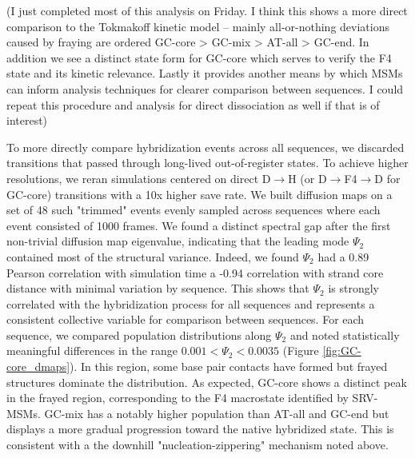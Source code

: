 \documentclass[journal=jpcbfk,manuscript=article]{achemso}
\begin{document}
(I just completed most of this analysis on Friday. I think this shows a more direct comparison to the Tokmakoff kinetic model -- mainly all-or-nothing deviations caused by fraying are ordered GC-core > GC-mix > AT-all > GC-end. In addition we see a distinct state form for GC-core which serves to verify the F4 state and its kinetic relevance. Lastly it provides another means by which MSMs can inform analysis techniques for clearer comparison between sequences. I could repeat this procedure and analysis for direct dissociation as well if that is of interest)

To more directly compare hybridization events across all sequences, we discarded transitions that passed through long-lived out-of-register states. To achieve higher resolutions, we reran simulations centered on direct D$\rightarrow$H (or D$\rightarrow$F4$\rightarrow$D for GC-core) transitions with a 10x higher save rate. We built diffusion maps on a set of 48 such "trimmed" events evenly sampled across sequences where each event consisted of 1000 frames. We found a distinct spectral gap after the first non-trivial diffusion map eigenvalue, indicating that the leading mode $\Psi_2$ contained most of the structural variance. Indeed, we found $\Psi_2$ had a 0.89 Pearson correlation with simulation time a -0.94 correlation with strand core distance with minimal variation by sequence. This shows that $\Psi_2$ is strongly correlated with the hybridization process for all sequences and represents a consistent collective variable for comparison between sequences. For each sequence, we compared population distributions along $\Psi_2$ and noted statistically meaningful differences in the range $ 0.001 <\Psi_2 < 0.0035$ (Figure \ref{fig:GC-core_dmaps}). In this region, some base pair contacts have formed but frayed structures dominate the distribution. As expected, GC-core shows a distinct peak in the frayed region, corresponding to the F4 macrostate identified by SRV-MSMs. GC-mix has a notably higher population than AT-all and GC-end but displays a more gradual progression toward the native hybridized state. This is consistent with a the downhill "nucleation-zippering" mechanism noted above.


\end{document}
